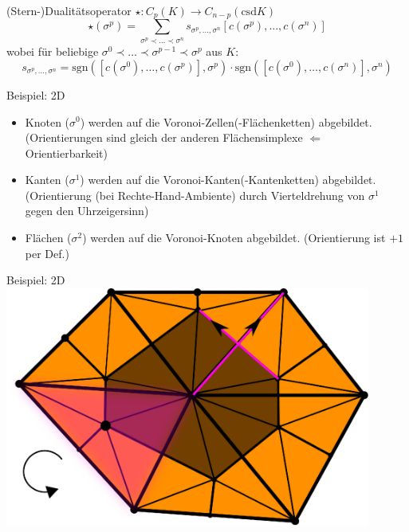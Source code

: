 \documentclass{beamer}
\begin{document}
  \begin{frame}
    \begin{block}{(Stern-)Dualitätsoperator \( \star: C_{p}(K) \longrightarrow C_{n-p}(\text{csd}K) \)}
      \[ \star(\sigma^{p}) = \sum_{\sigma^{p} \prec \ldots \prec \sigma^{n}} s_{\sigma^{p},\ldots,\sigma^{n}} \left[ c(\sigma^{p}),\ldots,c(\sigma^{n}) \right]  \]
      wobei für beliebige \( \sigma^{0} \prec \ldots \prec \sigma^{p-1} \prec \sigma^{p} \) aus \( K \):
      \[ s_{\sigma^{p},\ldots,\sigma^{n}} = \text{sgn}\left( \left[ c(\sigma^{0}),\ldots,c(\sigma^{p}) \right], \sigma^{p} \right) 
                                      \cdot \text{sgn}\left( \left[ c(\sigma^{0}),\ldots,c(\sigma^{n}) \right], \sigma^{n} \right) \]
    \end{block}
    \begin{block}{Beispiel: 2D}
      \begin{itemize}
        \item Knoten (\( \sigma^{0} \)) werden auf die  Voronoi-\glqq Zellen\grqq (-Flächenketten) abgebildet.
          (Orientierungen sind gleich der anderen Flächensimplexe \(\Leftarrow\) Orientierbarkeit) 
        \item Kanten (\( \sigma^{1} \)) werden auf die Voronoi-\glqq Kanten\grqq (-Kantenketten) abgebildet.
          (Orientierung (bei Rechte-Hand-Ambiente) durch Vierteldrehung von \( \sigma^{1} \) gegen den Uhrzeigersinn)
        \item Flächen (\( \sigma^{2} \)) werden auf die Voronoi-Knoten abgebildet. (Orientierung ist \( +1 \) per Def.)
      \end{itemize}
    \end{block}
  \end{frame}
    
  \begin{frame}
    \begin{block}{Beispiel: 2D}
      \centering\includegraphics[width=0.9\textwidth]{bilder/inkscape/dualSigma0.eps}
    \end{block}
  \end{frame}
\end{document}
